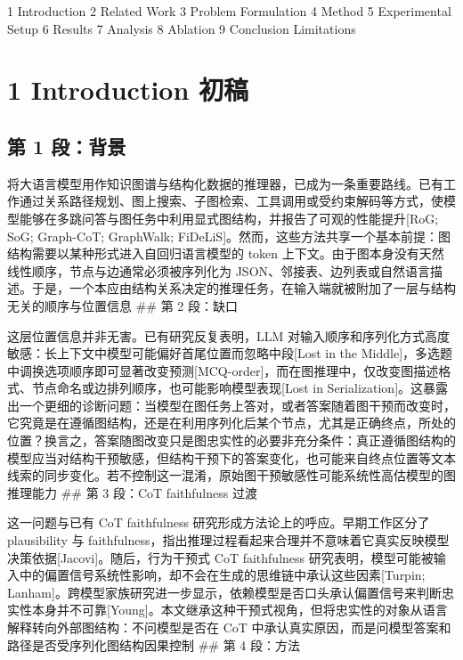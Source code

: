 \documentclass[
  11pt,
]{article}
\author{}
\date{}
\begin{document}
1 Introduction 2 Related Work 3 Problem Formulation 4 Method 5
Experimental Setup 6 Results 7 Analysis 8 Ablation 9 Conclusion
Limitations

\section{1 Introduction 初稿}\label{introduction-ux521dux7a3f}

\subsection{第 1 段：背景}\label{ux7b2c-1-ux6bb5ux80ccux666f}

将大语言模型用作知识图谱与结构化数据的推理器，已成为一条重要路线。已有工作通过关系路径规划、图上搜索、子图检索、工具调用或受约束解码等方式，使模型能够在多跳问答与图任务中利用显式图结构，并报告了可观的性能提升{[}RoG;
SoG; Graph-CoT; GraphWalk;
FiDeLiS{]}。然而，这些方法共享一个基本前提：图结构需要以某种形式进入自回归语言模型的
token 上下文。由于图本身没有天然线性顺序，节点与边通常必须被序列化为
JSON、邻接表、边列表或自然语言描述。于是，一个本应由结构关系决定的推理任务，在输入端就被附加了一层与结构无关的顺序与位置信息
\#\# 第 2 段：缺口

这层位置信息并非无害。已有研究反复表明，LLM
对输入顺序和序列化方式高度敏感：长上下文中模型可能偏好首尾位置而忽略中段{[}Lost
in the
Middle{]}，多选题中调换选项顺序即可显著改变预测{[}MCQ-order{]}，而在图推理中，仅改变图描述格式、节点命名或边排列顺序，也可能影响模型表现{[}Lost
in
Serialization{]}。这暴露出一个更细的诊断问题：当模型在图任务上答对，或者答案随着图干预而改变时，它究竟是在遵循图结构，还是在利用序列化后某个节点，尤其是正确终点，所处的位置？换言之，答案随图改变只是图忠实性的必要非充分条件：真正遵循图结构的模型应当对结构干预敏感，但结构干预下的答案变化，也可能来自终点位置等文本线索的同步变化。若不控制这一混淆，原始图干预敏感性可能系统性高估模型的图推理能力
\#\# 第 3 段：CoT faithfulness 过渡

这一问题与已有 CoT faithfulness 研究形成方法论上的呼应。早期工作区分了
plausibility 与
faithfulness，指出推理过程看起来合理并不意味着它真实反映模型决策依据{[}Jacovi{]}。随后，行为干预式
CoT faithfulness
研究表明，模型可能被输入中的偏置信号系统性影响，却不会在生成的思维链中承认这些因素{[}Turpin;
Lanham{]}。跨模型家族研究进一步显示，依赖模型是否口头承认偏置信号来判断忠实性本身并不可靠{[}Young{]}。本文继承这种干预式视角，但将忠实性的对象从语言解释转向外部图结构：不问模型是否在
CoT 中承认真实原因，而是问模型答案和路径是否受序列化图结构因果控制 \#\#
第 4 段：方法
\end{document}
